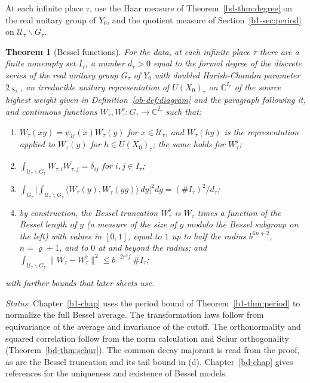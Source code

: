 \documentclass[reqno]{amsart}
\newcounter{chap}
\theoremstyle{definition}
\theoremstyle{plain}
\newtheorem{theorem}{Theorem}[section]
\theoremstyle{remark}
\newcommand{\C}{\mathbb{C}}
\newcommand{\Uc}{\mathcal U}
\begin{document}
At each infinite place \(\tau\), use the Haar measure of Theorem~\ref{bd-thm:degree} on the real unitary group of \(Y_0\), and the quotient measure of Section~\ref{b1-sec:period} on \(\Uc_\tau\backslash G_\tau\).

\begin{theorem}[Bessel functions]\label{thm:bessel-system}
For the data, at each infinite place \(\tau\) there are a finite nonempty set \(I_\tau\), a number \(d_\tau>0\) equal to the formal degree of the discrete series of the real unitary group \(G_\tau\) of \(Y_0\) with doubled Harish-Chandra parameter \(2\varsigma_\tau\), an irreducible unitary representation of \(U(X_0)_\tau\) on \(\C^{I_\tau}\) of the source highest weight given in Definition~\ref{ob-def:diagram} and the paragraph following it, and continuous functions \(W_\tau,W_\tau^\flat\colon G_\tau\to\C^{I_\tau}\) such that:
\begin{enumerate}
\item[(a)] \(W_\tau(xy)=\psi_{\Uc}(x)W_\tau(y)\) for \(x\in\Uc_\tau\), and \(W_\tau(hy)\) is the representation applied to \(W_\tau(y)\) for \(h\in U(X_0)_\tau\); the same holds for \(W_\tau^\flat\);
\item[(b)] \(\int_{\Uc_\tau\backslash G_\tau}W_{\tau,i}\overline{W_{\tau,j}}=\delta_{ij}\) for \(i,j\in I_\tau\);
\item[(c)] \(\int_{G_\tau}\bigl\lvert\int_{\Uc_\tau\backslash G_\tau}\langle W_\tau(y),W_\tau(yg)\rangle\,dy\bigr\rvert^2dg=(\#I_\tau)^2/d_\tau\);
\item[(d)] by construction, the \emph{Bessel truncation} \(W_\tau^\flat\) is \(W_\tau\) times a function of the Bessel length of \(y\) (a measure of the size of \(y\) modulo the Bessel subgroup on the left) with values in \([0,1]\), equal to \(1\) up to half the radius \(b^{6n+2}\), \(n=\varrho+1\), and to \(0\) at and beyond the radius; and \(\int_{\Uc_\tau\backslash G_\tau}\lVert W_\tau-W_\tau^\flat\rVert^2\le b^{-2r^3f}\,\#I_\tau\);
\end{enumerate}
with further bounds that later sheets use.
\end{theorem}

\noindent\emph{Status}: Chapter~\ref{b1-chap} uses the period bound of Theorem~\ref{b1-thm:period} to normalize the full Bessel average.  The transformation laws follow from equivariance of the average and invariance of the cutoff.  The orthonormality and squared correlation follow from the norm calculation and Schur orthogonality (Theorem~\ref{bd-thm:schur}).  The common decay majorant is read from the proof, as are the Bessel truncation and its tail bound in (d).  Chapter~\ref{bd-chap} gives references for the uniqueness and existence of Bessel models.
\end{document}
